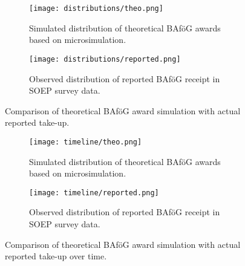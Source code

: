 \begin{figure}[htbp]
  \centering
  \begin{subfigure}[t]{0.48\linewidth}
    \texttt{[image: distributions/theo.png]}
    \caption{Simulated distribution of theoretical BAföG awards based on microsimulation.}
    \label{fig:simulated_distribution}
  \end{subfigure}
  \hfill
  \begin{subfigure}[t]{0.48\linewidth}
    \texttt{[image: distributions/reported.png]}
    \caption{Observed distribution of reported BAföG receipt in SOEP survey data.}
    \label{fig:reported_distribution}
  \end{subfigure}
  \caption{Comparison of theoretical BAföG award simulation with actual reported take-up.}
  \label{fig:bafoeg_distribution_comparison}
\end{figure}

\begin{figure}[htbp]
  \centering
  \begin{subfigure}[t]{0.48\linewidth}
    \texttt{[image: timeline/theo.png]}
    \caption{Simulated distribution of theoretical BAföG awards based on microsimulation.}
    \label{fig:simulated_timeline}
  \end{subfigure}
  \hfill
  \begin{subfigure}[t]{0.48\linewidth}
    \texttt{[image: timeline/reported.png]}
    \caption{Observed distribution of reported BAföG receipt in SOEP survey data.}
    \label{fig:reported_timeline}
  \end{subfigure}
  \caption{Comparison of theoretical BAföG award simulation with actual reported take-up over time.}
  \label{fig:bafoeg_timeline_comparison}
\end{figure}




